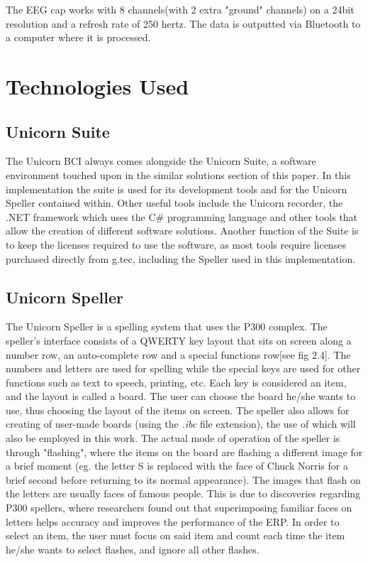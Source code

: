 The EEG cap works with 8 channels(with 2 extra "ground" channels) on a 24bit resolution and a refresh rate of 250 hertz. The data is outputted via Bluetooth to a computer where it is processed.


\section{Technologies Used}
\subsection{Unicorn Suite}
The Unicorn BCI always comes alongside the Unicorn Suite, a software environment touched upon in the similar solutions section of this paper. In this implementation the suite is used for its development tools and for the Unicorn Speller contained within. Other useful tools include the Unicorn recorder, the .NET framework which uses the C\# programming language and other tools that allow the creation of different software solutions. Another function of the Suite is to keep the licenses required to use the software, as most tools require licenses purchased directly from g.tec\cite{Unicorn_Shop}, including the Speller used in this implementation.


\subsection{Unicorn Speller}
The Unicorn Speller is a spelling system that uses the P300 complex\cite{UnicornSuite_Manual}. The speller's interface consists of a QWERTY key layout that sits on screen along a number row, an auto-complete row and a special functions row[see fig 2.4]. The numbers and letters are used for spelling while the special keys are used for other functions such as text to speech, printing, etc. Each key is considered an item, and the layout is called a board. The user can choose the board he/she wants to use, thus choosing the layout of the items on screen. The speller also allows for creating of user-made boards (using the \textit{.ibc} file extension), the use of which will also be employed in this work. 
\vspace{\baselineskip}\newline
The actual mode of operation of the speller is through "flashing"\cite{UnicornSuite_Manual}, where the items on the board are flashing a different image for a brief moment (eg. the letter S is replaced with the face of Chuck Norris for a brief second before returning to its normal appearance). The images that flash on the letters are usually faces of famous people. This is due to discoveries regarding P300 spellers, where researchers found out that superimposing familiar faces on letters helps accuracy and improves the performance of the ERP\cite{Li_2015}\cite{Kaufmann_2011}. In order to select an item, the user must focus on said item and count each time the item he/she wants to select flashes, and ignore all other flashes\cite{UnicornSuite_Manual}.


